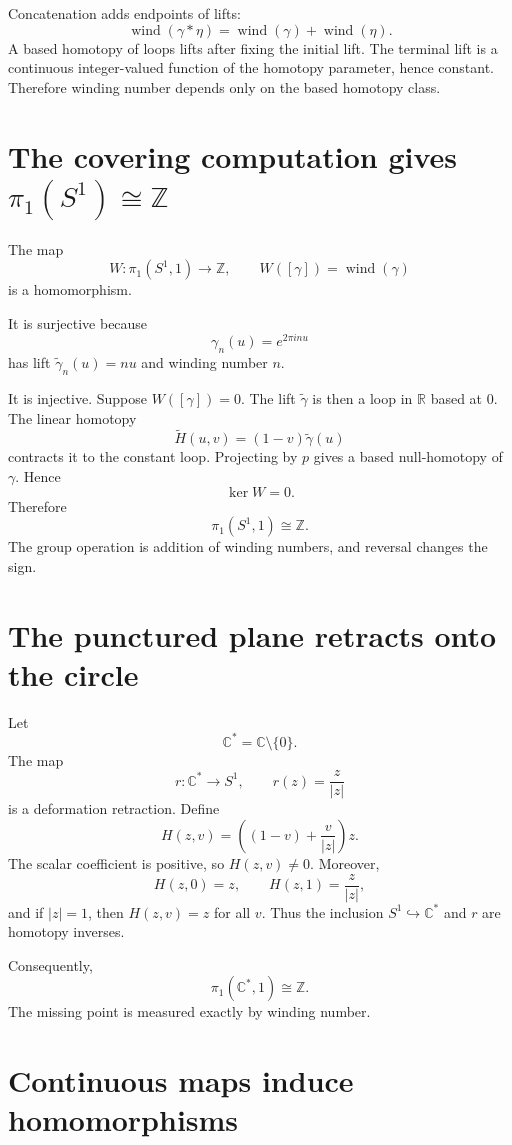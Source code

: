 Concatenation adds endpoints of lifts:
\[
  \operatorname{wind}(\gamma*\eta)
  =\operatorname{wind}(\gamma)+\operatorname{wind}(\eta).
\]
A based homotopy of loops lifts after fixing the initial lift.  The terminal lift is a continuous integer-valued function of the homotopy parameter, hence constant.  Therefore winding number depends only on the based homotopy class.

\section{The covering computation gives \texorpdfstring{$\pi_1(S^1)\cong\mathbb Z$}{pi1(S1)=Z}}

The map
\[
  W:\pi_1(S^1,1)\to\mathbb Z,
  \qquad
  W([\gamma])=\operatorname{wind}(\gamma)
\]
is a homomorphism.

It is surjective because
\[
  \gamma_n(u)=e^{2\pi i n u}
\]
has lift \(\widetilde\gamma_n(u)=nu\) and winding number \(n\).

It is injective.  Suppose \(W([\gamma])=0\).  The lift \(\widetilde\gamma\) is then a loop in \(\mathbb R\) based at \(0\).  The linear homotopy
\[
  \widetilde H(u,v)=(1-v)\widetilde\gamma(u)
\]
contracts it to the constant loop.  Projecting by \(p\) gives a based null-homotopy of \(\gamma\).  Hence
\[
  \ker W=0.
\]
Therefore
\[
  \boxed{\pi_1(S^1,1)\cong\mathbb Z.}
\]
The group operation is addition of winding numbers, and reversal changes the sign.

\section{The punctured plane retracts onto the circle}

Let
\[
  \mathbb C^*=\mathbb C\setminus\{0\}.
\]
The map
\[
  r:\mathbb C^*\to S^1,
  \qquad
  r(z)=\frac z{|z|}
\]
is a deformation retraction.  Define
\[
  H(z,v)=\left((1-v)+\frac v{|z|}\right)z.
\]
The scalar coefficient is positive, so \(H(z,v)\ne0\).  Moreover,
\[
  H(z,0)=z,
  \qquad
  H(z,1)=\frac z{|z|},
\]
and if \(|z|=1\), then \(H(z,v)=z\) for all \(v\).  Thus the inclusion \(S^1\hookrightarrow\mathbb C^*\) and \(r\) are homotopy inverses.

Consequently,
\[
  \boxed{\pi_1(\mathbb C^*,1)\cong\mathbb Z.}
\]
The missing point is measured exactly by winding number.

\section{Continuous maps induce homomorphisms}

